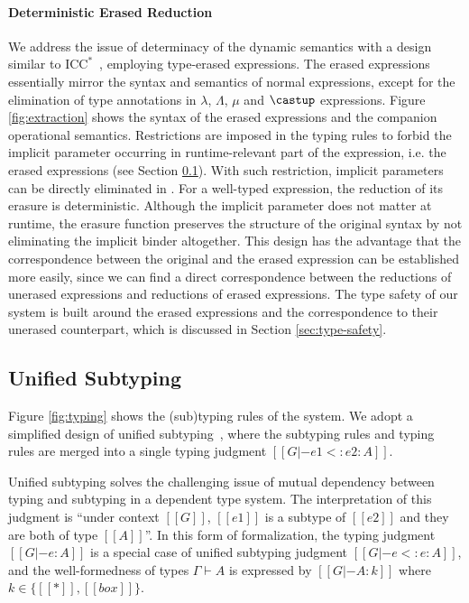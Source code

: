 \paragraph{Deterministic Erased Reduction}
We address the issue of determinacy of the dynamic semantics with
a design similar to $\mathrm{ICC}^*$~\cite{barras2008implicit},
employing type-erased expressions. The erased expressions
essentially mirror the syntax and semantics
of normal expressions, except for the elimination of type annotations in $\lambda$,
$\Lambda$, $\mu$ and $\castup$ expressions.
Figure \ref{fig:extraction} shows the syntax of the erased expressions and
the companion operational semantics. Restrictions are imposed in the
typing rules to forbid the implicit parameter occurring in runtime-relevant part
of the expression, i.e. the erased expressions (see Section \ref{sec:type-system}).
With such restriction, implicit parameters can be directly eliminated in
.
For a well-typed expression, the reduction of
its erasure is deterministic.
Although the implicit parameter does not matter at runtime, the erasure
function preserves the structure of the original syntax
by not eliminating the implicit binder altogether. This design
has the advantage that the correspondence
between the original and the erased expression can be established more easily,
since we can find a direct correspondence between
the reductions of unerased expressions and reductions of erased expressions.
The type safety of our system is built around the erased expressions and the
correspondence to their unerased counterpart, which is discussed in Section \ref{sec:type-safety}.

\subsection{Unified Subtyping}
\label{sec:type-system}

Figure \ref{fig:typing} shows the (sub)typing rules of the system. We adopt a
simplified design of unified subtyping~\cite{full}, where the subtyping rules and
typing rules are merged into a single typing judgment $[[G |- e1 <: e2 : A]]$.

Unified subtyping solves the challenging issue of mutual dependency between typing
and subtyping in a dependent type system.
The interpretation of this judgment is ``under context $[[G]]$, $[[e1]]$ is a
subtype of $[[e2]]$ and they are both of type $[[A]]$''.
In this form of formalization, the typing judgment $[[G |- e : A]]$ is a
special case of unified subtyping judgment $[[G |- e <: e : A]]$,
and the well-formedness of types $\Gamma \vdash A$ is expressed by
$[[G |- A : k]]$ where $k \in \{[[*]], [[box]]\}$.

